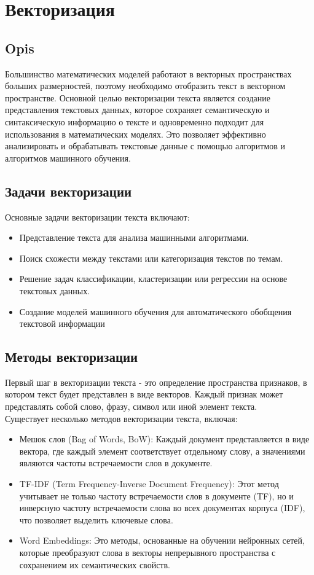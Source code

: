 \section{Векторизация}

	\subsection{Opis}
		Большинство математических моделей работают в векторных пространствах больших размерностей, поэтому необходимо отобразить текст в векторном пространстве. Основной целью векторизации текста является создание представления текстовых данных, которое сохраняет семантическую и синтаксическую информацию о тексте и одновременно подходит для использования в математических моделях. Это позволяет эффективно анализировать и обрабатывать текстовые данные с помощью алгоритмов и алгоритмов машинного обучения. \cite{Vectorization}

	\subsection{Задачи векторизации}
		Основные задачи векторизации текста включают:
		\begin{itemize}
			\item Представление текста для анализа машинными алгоритмами.
			\item Поиск схожести между текстами или категоризация текстов по темам.
			\item Решение задач классификации, кластеризации или регрессии на основе текстовых данных.
			\item Создание моделей машинного обучения для автоматического обобщения текстовой информации
		\end{itemize}

	\subsection{Методы векторизации}
		Первый шаг в векторизации текста - это определение пространства признаков, в котором текст будет представлен в виде векторов. Каждый признак может представлять собой слово, фразу, символ или иной элемент текста.\\
		Существует несколько методов векторизации текста, включая:
		\begin{itemize}
			\item Мешок слов (Bag of Words, BoW): Каждый документ представляется в виде вектора, где каждый элемент соответствует отдельному слову, а значениями являются частоты встречаемости слов в документе.
			\item TF-IDF (Term Frequency-Inverse Document Frequency): Этот метод учитывает не только частоту встречаемости слов в документе (TF), но и инверсную частоту встречаемости слова во всех документах корпуса (IDF), что позволяет выделить ключевые слова.
			\item Word Embeddings: Это методы, основанные на обучении нейронных сетей, которые преобразуют слова в векторы непрерывного пространства с сохранением их семантических свойств.\\
		\end{itemize}

